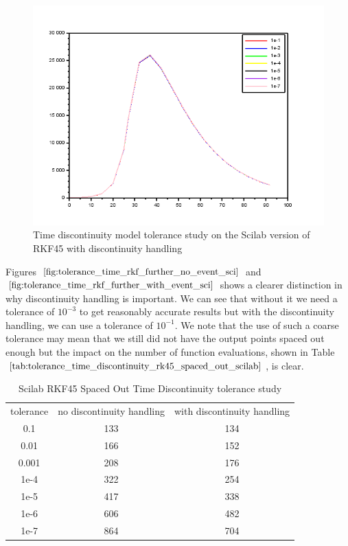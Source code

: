 \begin{figure}[h]
\centering
\includegraphics[width=0.7\linewidth]{./figures/tolerance_time_rkf_further_with_event_sci}
\caption{Time discontinuity model tolerance study on the Scilab version of RKF45 with discontinuity handling}
\label{fig:tolerance_time_rkf_further_with_event_sci}
\end{figure}

Figures $\ref{fig:tolerance_time_rkf_further_no_event_sci}$ and $\ref{fig:tolerance_time_rkf_further_with_event_sci}$ shows a clearer distinction in why discontinuity handling is important. We can see that without it we need a tolerance of $10^{-3}$ to get reasonably accurate results but with the discontinuity handling, we can use a tolerance of $10^{-1}$. We note that the use of such a coarse tolerance may mean that we still did not have the output points spaced out enough but the impact on the number of function evaluations, shown in Table $\ref{tab:tolerance_time_discontinuity_rk45_spaced_out_scilab}$, is clear.

\begin{table}[h]
\caption {Scilab RKF45 Spaced Out Time Discontinuity tolerance study} 
\label{tab:tolerance_time_discontinuity_rk45_spaced_out_scilab} 
\begin{center}
\begin{tabular}{ c c c }
tolerance & no discontinuity handling & with discontinuity handling\\ 
0.1 & 133 & 134 \\
0.01 & 166 & 152 \\
0.001 & 208 & 176 \\
1e-4 & 322 & 254 \\
1e-5 & 417 & 338 \\
1e-6 & 606 & 482 \\
1e-7 & 864 & 704 \\
\end{tabular}
\end{center}
\end{table}

